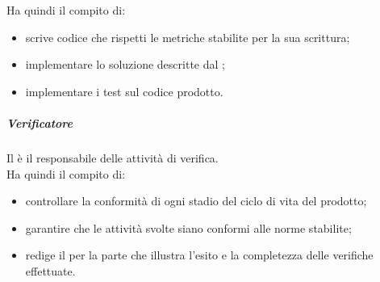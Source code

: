 				Ha quindi il compito di:
					\begin{itemize}
						\item scrive codice che rispetti le metriche stabilite per la sua scrittura;
						\item implementare lo soluzione descritte dal \roleDesigner;
						\item implementare i test sul codice prodotto.
					\end{itemize}
				\subparagraph{Verificatore}
				Il \roleVerifier{} è il responsabile delle attività di verifica. \\
				Ha quindi il compito di:
					\begin{itemize}
						\item controllare la conformità di ogni stadio del ciclo di vita del prodotto;
						\item garantire che le attività svolte siano conformi alle norme stabilite;
						\item redige il \docNameVersionPdQ{} per la parte che illustra l'esito e la completezza delle verifiche effettuate.
					\end{itemize}
		
